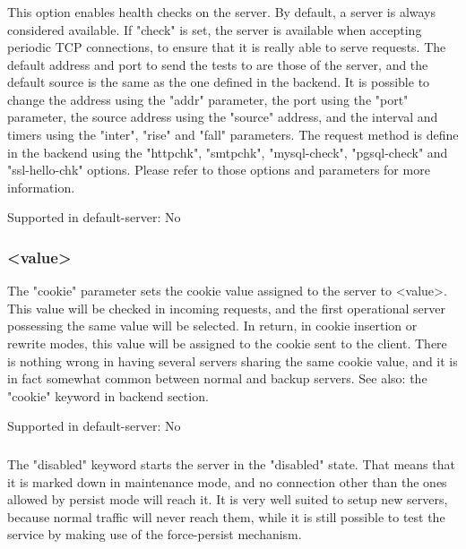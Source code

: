 \subsubsection[check]{}
  This option enables health checks on the server. By default, a server is
  always considered available. If "check" is set, the server is available when
  accepting periodic TCP connections, to ensure that it is really able to serve
  requests. The default address and port to send the tests to are those of the
  server, and the default source is the same as the one defined in the
  backend. It is possible to change the address using the "addr" parameter, the
  port using the "port" parameter, the source address using the "source"
  address, and the interval and timers using the "inter", "rise" and "fall"
  parameters. The request method is define in the backend using the "httpchk",
  "smtpchk", "mysql-check", "pgsql-check" and "ssl-hello-chk" options. Please
  refer to those options and parameters for more information.

  Supported in default-server: No

\subsubsection[cookie]{ <value>}
  The "cookie" parameter sets the cookie value assigned to the server to
  <value>. This value will be checked in incoming requests, and the first
  operational server possessing the same value will be selected. In return, in
  cookie insertion or rewrite modes, this value will be assigned to the cookie
  sent to the client. There is nothing wrong in having several servers sharing
  the same cookie value, and it is in fact somewhat common between normal and
  backup servers. See also: the "cookie" keyword in backend section.

  Supported in default-server: No

\subsubsection[disabled]{}
  The "disabled" keyword starts the server in the "disabled" state. That means
  that it is marked down in maintenance mode, and no connection other than the
  ones allowed by persist mode will reach it. It is very well suited to setup
  new servers, because normal traffic will never reach them, while it is still
  possible to test the service by making use of the force-persist mechanism.

